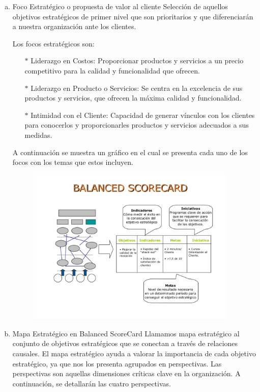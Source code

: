 	\begin{enumerate}[a)]
       	 \item Foco Estratégico o propuesta de valor al cliente
		Selección de aquellos objetivos estratégicos de primer nivel que son prioritarios y que diferenciarán a nuestra organización ante los clientes.

Los focos estratégicos son:

		\begin{itemize}

 		\item[$*$] Liderazgo en Costos: Proporcionar productos y servicios a un precio competitivo para la calidad y funcionalidad que ofrecen.
		\item[$*$] Liderazgo en Producto o Servicios: Se centra en la excelencia de sus productos y servicios, que ofrecen la máxima calidad y funcionalidad.
		\item[$*$] Intimidad con el Cliente: Capacidad de generar vínculos con los clientes para conocerlos y proporcionarles productos y servicios adecuados a sus medidas.

		\end{itemize}

	A continuación se muestra un gráfico en el cual se presenta cada uno de los focos con los temas que estos incluyen.

			\begin{figure}[htb]
				\begin{center}
					\includegraphics[width=10cm]{./Imagenes/2}
				\end{center}
			\end{figure}


        \item Mapa Estratégico en Balanced ScoreCard
	Llamamos mapa estratégico al conjunto de objetivos estratégicos que se conectan a través de relaciones causales.
El mapa estratégico ayuda a valorar la importancia de cada objetivo estratégico, ya que nos los presenta agrupados en perspectivas. Las perspectivas son aquellas dimensiones críticas clave en la organización. A continuación, se detallarán las cuatro perspectivas.


\end{enumerate}
